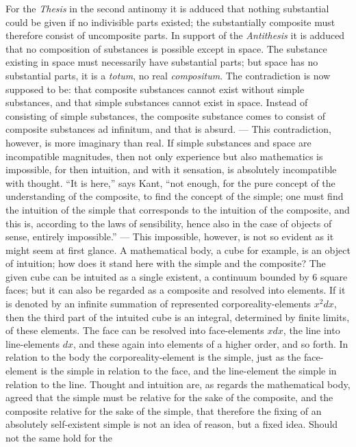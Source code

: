 \documentclass[12pt]{article}
\begin{document}
For the \emph{Thesis} in the second antinomy it is adduced that nothing
substantial could be given if no indivisible parts existed; the
substantially composite must therefore consist of uncomposite parts. In
support of the \emph{Antithesis} it is adduced that no composition of
substances is possible except in space. The substance existing in space
must necessarily have substantial parts; but space has no substantial
parts, it is a \emph{totum}, no real \emph{compositum}. The contradiction
is now supposed to be: that composite substances cannot exist without
simple substances, and that simple substances cannot exist in space.
Instead of consisting of simple substances, the composite substance comes
to consist of composite substances ad infinitum, and that is absurd. ---
This contradiction, however, is more imaginary than real. If simple
substances and space are incompatible magnitudes, then not only experience
but also mathematics is impossible, for then intuition, and with it
sensation, is absolutely incompatible with thought. ``It is here,'' says
Kant, ``not enough, for the pure concept of the understanding of the
composite, to find the concept of the simple; one must find the intuition
of the simple that corresponds to the intuition of the composite, and this
is, according to the laws of sensibility, hence also in the case of objects
of sense, entirely impossible.'' --- This impossible, however, is not so
evident as it might seem at first glance. A mathematical body, a cube for
example, is an object of intuition; how does it stand here with the simple
and the
composite? The given cube can be intuited as a single existent, a continuum
bounded by 6 square faces; but it can also be regarded as a composite and
resolved into elements. If it is denoted by an infinite summation of
represented corporeality-elements $x^2dx$, then the third part of the
intuited cube is an integral, determined by finite limits, of these
elements. The face can be resolved into face-elements $xdx$, the line into
line-elements $dx$, and these again into elements of a higher order, and so
forth. In relation to the body the corporeality-element is the simple, just
as the face-element is the simple in relation to the face, and the
line-element the simple in relation to the line. Thought and intuition are,
as regards the mathematical body, agreed that the simple must be relative
for the sake of the composite, and the composite relative for the sake of
the simple, that therefore the fixing of an absolutely self-existent simple
is not an idea of reason, but a fixed idea. Should not the same hold for the
\end{document}
